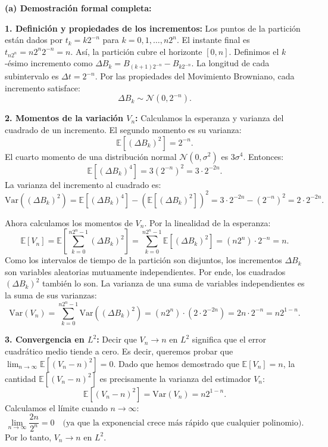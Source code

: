 \documentclass[11pt, letterpaper]{article}
\begin{document}
\begin{solucion}
    \vspace{3mm}
    \textbf{(a) Demostración formal completa:}

    \textbf{1. Definición y propiedades de los incrementos:}
    Los puntos de la partición están dados por $t_k = k2^{-n}$ para $k = 0, 1, \dots, n2^n$. El instante final es $t_{n2^n} = n2^n 2^{-n} = n$. Así, la partición cubre el horizonte $[0, n]$.
    Definimos el $k$-ésimo incremento como $\Delta B_k = B_{(k+1)2^{-n}} - B_{k2^{-n}}$.
    La longitud de cada subintervalo es $\Delta t = 2^{-n}$.
    Por las propiedades del Movimiento Browniano, cada incremento satisface:
    \[ \Delta B_k \sim \mathcal{N}(0, 2^{-n}). \]
    
    \textbf{2. Momentos de la variación $V_n$:}
    Calculamos la esperanza y varianza del cuadrado de un incremento.
    El segundo momento es su varianza:
    \[ \mathbb{E}[(\Delta B_k)^2] = 2^{-n}. \]
    El cuarto momento de una distribución normal $\mathcal{N}(0, \sigma^2)$ es $3\sigma^4$. Entonces:
    \[ \mathbb{E}[(\Delta B_k)^4] = 3(2^{-n})^2 = 3 \cdot 2^{-2n}. \]
    La varianza del incremento al cuadrado es:
    \[ \text{Var}((\Delta B_k)^2) = \mathbb{E}[(\Delta B_k)^4] - (\mathbb{E}[(\Delta B_k)^2])^2 = 3 \cdot 2^{-2n} - (2^{-n})^2 = 2 \cdot 2^{-2n}. \]

    Ahora calculamos los momentos de $V_n$.
    Por la linealidad de la esperanza:
    \[ \mathbb{E}[V_n] = \mathbb{E} \left[ \sum_{k=0}^{n2^n-1} (\Delta B_k)^2 \right] = \sum_{k=0}^{n2^n-1} \mathbb{E}[(\Delta B_k)^2] = (n2^n) \cdot 2^{-n} = n. \]
    Como los intervalos de tiempo de la partición son disjuntos, los incrementos $\Delta B_k$ son variables aleatorias mutuamente independientes. Por ende, los cuadrados $(\Delta B_k)^2$ también lo son. La varianza de una suma de variables independientes es la suma de sus varianzas:
    \[ \text{Var}(V_n) = \sum_{k=0}^{n2^n-1} \text{Var}((\Delta B_k)^2) = (n2^n) \cdot (2 \cdot 2^{-2n}) = 2n \cdot 2^{-n} = n 2^{1-n}. \]

    \textbf{3. Convergencia en $L^2$:}
    Decir que $V_n \to n$ en $L^2$ significa que el error cuadrático medio tiende a cero. Es decir, queremos probar que $\lim_{n \to \infty} \mathbb{E}[(V_n - n)^2] = 0$.
    Dado que hemos demostrado que $\mathbb{E}[V_n] = n$, la cantidad $\mathbb{E}[(V_n - n)^2]$ es precisamente la varianza del estimador $V_n$:
    \[ \mathbb{E}[(V_n - n)^2] = \text{Var}(V_n) = n 2^{1-n}. \]
    Calculamos el límite cuando $n \to \infty$:
    \[ \lim_{n \to \infty} \frac{2n}{2^n} = 0 \quad \text{(ya que la exponencial crece más rápido que cualquier polinomio)}. \]
    Por lo tanto, $V_n \to n$ en $L^2$.


\end{solucion}
\end{document}

